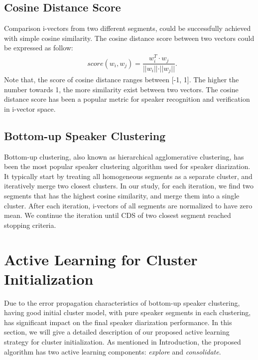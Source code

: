 \documentclass[final,authoryear,5p,times,twocolumn]{elsarticle}
\begin{document}
\subsection{Cosine Distance Score}
Comparison  i-vectors from two different segments, could be successfully achieved with simple cosine similarity. The cosine distance score between two vectors could be expressed as follow:
\begin{equation}
\begin{aligned}
& score (w_i, w_j) = \dfrac{w^T_i \cdot w_j}{\rvert\rvert{w_i}\rvert\rvert \cdot \rvert\rvert{w_j}\rvert\rvert}.
\label{ws2}
\end{aligned}
\end{equation}
Note that, the score of cosine distance ranges between [-1, 1]. The higher the number towards 1, the more similarity exist between two vectors. The cosine distance score has been a popular metric for speaker recognition and verification in i-vector space.
 
\subsection{Bottom-up Speaker Clustering}
Bottom-up clustering, also known as hierarchical agglomerative clustering, has been the most popular speaker clustering algorithm used for speaker diarization. It typically start by treating all homogeneous segments as a separate cluster, and iteratively merge two closest clusters. In our study, for each iteration, we find two segments that has the highest cosine similarity, and merge them into a single cluster. After each iteration, i-vectors of all segments are normalized to have zero mean. We continue the iteration until CDS of two closest segment reached stopping criteria. 

\section{Active Learning for Cluster Initialization}
Due to the error propagation characteristics of bottom-up speaker clustering, having good initial cluster model, with pure speaker segments in each clustering, has significant impact on the final speaker diarization performance. In this section, we will give a detailed description of our proposed active learning strategy for cluster initialization. As mentioned in Introduction, the proposed algorithm has two active learning components: \textit{explore} and \textit{consolidate}.
\end{document}
